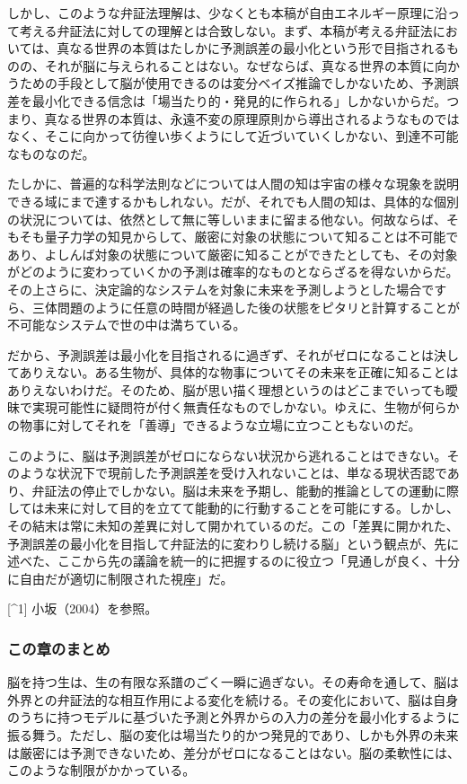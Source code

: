 しかし、このような弁証法理解は、少なくとも本稿が自由エネルギー原理に沿って考える弁証法に対しての理解とは合致しない。まず、本稿が考える弁証法においては、真なる世界の本質はたしかに予測誤差の最小化という形で目指されるものの、それが脳に与えられることはない。なぜならば、真なる世界の本質に向かうための手段として脳が使用できるのは変分ベイズ推論でしかないため、予測誤差を最小化できる信念は「場当たり的・発見的に作られる」しかないからだ。つまり、真なる世界の本質は、永遠不変の原理原則から導出されるようなものではなく、そこに向かって彷徨い歩くようにして近づいていくしかない、到達不可能なものなのだ。

たしかに、普遍的な科学法則などについては人間の知は宇宙の様々な現象を説明できる域にまで達するかもしれない。だが、それでも人間の知は、具体的な個別の状況については、依然として無に等しいままに留まる他ない。何故ならば、そもそも量子力学の知見からして、厳密に対象の状態について知ることは不可能であり、よしんば対象の状態について厳密に知ることができたとしても、その対象がどのように変わっていくかの予測は確率的なものとならざるを得ないからだ。その上さらに、決定論的なシステムを対象に未来を予測しようとした場合ですら、三体問題のように任意の時間が経過した後の状態をピタリと計算することが不可能なシステムで世の中は満ちている。

だから、予測誤差は最小化を目指されるに過ぎず、それがゼロになることは決してありえない。ある生物が、具体的な物事についてその未来を正確に知ることはありえないわけだ。そのため、脳が思い描く理想というのはどこまでいっても曖昧で実現可能性に疑問符が付く無責任なものでしかない。ゆえに、生物が何らかの物事に対してそれを「善導」できるような立場に立つこともないのだ。

このように、脳は予測誤差がゼロにならない状況から逃れることはできない。そのような状況下で現前した予測誤差を受け入れないことは、単なる現状否認であり、弁証法の停止でしかない。脳は未来を予期し、能動的推論としての運動に際しては未来に対して目的を立てて能動的に行動することを可能にする。しかし、その結末は常に未知の差異に対して開かれているのだ。この「差異に開かれた、予測誤差の最小化を目指して弁証法的に変わりし続ける脳」という観点が、先に述べた、ここから先の議論を統一的に把握するのに役立つ「見通しが良く、十分に自由だが適切に制限された視座」だ。

{[}\^{}1{]} 小坂（2004）を参照。

\subsubsection{この章のまとめ}\label{ux3053ux306eux7ae0ux306eux307eux3068ux3081}

脳を持つ生は、生の有限な系譜のごく一瞬に過ぎない。その寿命を通して、脳は外界との弁証法的な相互作用による変化を続ける。その変化において、脳は自身のうちに持つモデルに基づいた予測と外界からの入力の差分を最小化するように振る舞う。ただし、脳の変化は場当たり的かつ発見的であり、しかも外界の未来は厳密には予測できないため、差分がゼロになることはない。脳の柔軟性には、このような制限がかかっている。
